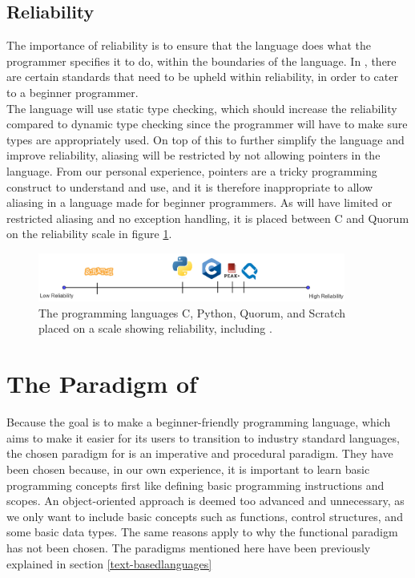 \subsection{Reliability} \label{LanguageDesign:Realiability}
The importance of reliability is to ensure that the language does what the programmer specifies it to do, within the boundaries of the language. In \lang, there are certain standards that need to be upheld within reliability, in order to cater to a beginner programmer. \\

The language will use static type checking, which should increase the reliability compared to dynamic type checking since the programmer will have to make sure types are appropriately used. On top of this to further simplify the language and improve reliability, aliasing will be restricted by not allowing pointers in the language. From our personal experience, pointers are a tricky programming construct to understand and use, and it is therefore inappropriate to allow aliasing in a language made for beginner programmers. As \lang will have limited or restricted aliasing and no exception handling, it is placed between C and Quorum on the reliability scale in figure \ref{LD:reliability_scale}.

\begin{figure}[H] 
    \begin{center}
        \includegraphics[width=0.9\textwidth]{Files/Billeder: Design/ReliabilityOwn.png}
    \end{center}
    \caption{The programming languages C, Python, Quorum, and Scratch placed on a scale showing reliability, including \lang.}
    \label{LD:reliability_scale}
\end{figure}


\section{The Paradigm of \lang}
Because the goal is to make a beginner-friendly programming language, which aims to make it easier for its users to transition to industry standard languages, the chosen paradigm for \lang is an imperative and procedural paradigm. They have been chosen because, in our own experience, it is important to learn basic programming concepts first like defining basic programming instructions and scopes. An object-oriented approach is deemed too advanced and unnecessary, as we only want to include basic concepts such as functions, control structures, and some basic data types. The same reasons apply to why the functional paradigm has not been chosen. The paradigms mentioned here have been previously explained in section \ref{text-basedlanguages}

